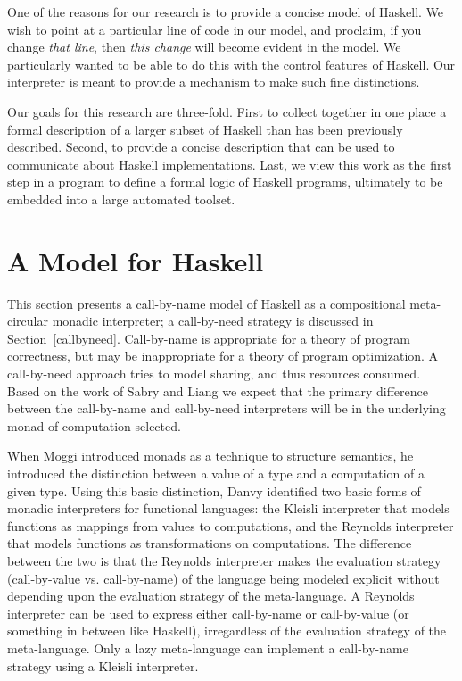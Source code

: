 \documentclass{entcs} \usepackage{entcsmacro}
\begin{document}
One of the reasons for our research is to provide a concise model of Haskell. We
wish to point at a particular line of code in our model, and proclaim, if you
change {\em that line}, then {\em this change} will become evident in the model.
We particularly wanted to be able to do this with the control features of
Haskell. Our interpreter is meant to provide a mechanism to make such fine
distinctions.

Our goals for this research are three-fold. First to collect together in one place a formal
description of a larger subset of Haskell than has been previously described. Second, to
provide a concise description that can be used to communicate about Haskell
implementations. Last, we view this work as the first step in a program to define a formal
logic of Haskell programs, ultimately to be embedded into a large automated
toolset\cite{programatica}.


\section{A Model for Haskell}

This section presents a call-by-name model of Haskell as a
compositional meta-circular monadic interpreter; a call-by-need
strategy is discussed in Section~\ref{callbyneed}.  Call-by-name
is appropriate for a theory of program correctness, but may be
inappropriate for a theory of program optimization. A call-by-need
approach tries to model sharing, and thus resources consumed.  Based
on the work of Sabry and Liang we expect that the primary difference
between the call-by-name and call-by-need interpreters will be in the
underlying monad of computation selected\cite{JFP::Sabry1998}.

When Moggi\cite{MoggiE90a} introduced monads as a technique to structure semantics, he
introduced the distinction between a value of a type and a computation of a given type.
Using this basic distinction, Danvy\cite{Danvy} identified two basic forms of monadic
interpreters for functional languages:  the Kleisli interpreter that models functions as
mappings from values to computations, and the Reynolds\cite{Reynolds} interpreter that
models functions as transformations on computations.  The difference between the two is
that the Reynolds interpreter makes the evaluation strategy (call-by-value vs.
call-by-name) of the language being modeled explicit without depending upon the evaluation
strategy of the meta-language. A Reynolds interpreter can be used to express either
call-by-name or call-by-value (or something in between like Haskell), irregardless of the
evaluation strategy of the meta-language. Only a lazy meta-language can implement a
call-by-name strategy using a Kleisli interpreter.
\end{document}
